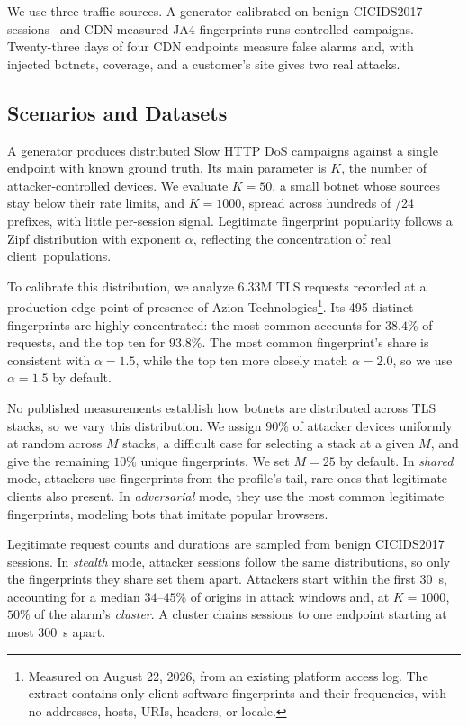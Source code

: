 \documentclass[conference,letterpaper,10pt]{IEEEtran}
\newcommand\1{\textit{(i)}}
\newcommand\2{\textit{(ii)}}
\newcommand\3{\textit{(iii)}}
\newcommand\4{\textit{(iv)}}
\newcommand\5{\textit{(v)}}
\newcommand\6{\textit{(vi)}}
\newcommand\7{\textit{(vii)}}
\newcommand\8{\textit{(viii)}}
\newcommand\9{\textit{(ix)}}
\begin{document}
We use three traffic sources. A generator calibrated on benign CICIDS2017 sessions~\cite{sharafaldin2018cicids} and CDN-measured JA4 fingerprints runs controlled campaigns. Twenty-three days of four CDN endpoints measure false alarms and, with injected botnets, coverage, and a customer's site gives two real attacks.

\subsection{Scenarios and Datasets}

A generator produces distributed Slow HTTP DoS campaigns against a single endpoint with known ground truth. Its main parameter is $K$, the number of attacker-controlled devices. We evaluate $K=50$, a small botnet whose sources stay below their rate limits, and $K=1000$, spread across hundreds of /24 prefixes, with little per-session signal. Legitimate fingerprint popularity follows a Zipf distribution with exponent $\alpha$, reflecting the concentration of real client~populations.

To calibrate this distribution, we analyze $6.33$M TLS requests recorded at a production edge point of presence of Azion Technologies\footnote{Measured on August 22, 2026, from an existing platform access log. The extract contains only client-software fingerprints and their frequencies, with no addresses, hosts, URIs, headers, or locale.}. Its 495 distinct fingerprints are highly concentrated: the most common accounts for $38.4\%$ of requests, and the top ten for $93.8\%$. The most common fingerprint's share is consistent with $\alpha=1.5$, while the top ten more closely match $\alpha=2.0$, so we use $\alpha=1.5$ by default.

No published measurements establish how botnets are distributed across TLS stacks, so we vary this distribution. We assign $90\%$ of attacker devices uniformly at random across $M$ stacks, a difficult case for selecting a stack at a given $M$, and give the remaining $10\%$ unique fingerprints. We set $M=25$ by default. In \textit{shared} mode, attackers use fingerprints from the profile's tail, rare ones that legitimate clients also present. In \textit{adversarial} mode, they use the most common legitimate fingerprints, modeling bots that imitate popular browsers.

Legitimate request counts and durations are sampled from benign CICIDS2017 sessions.  In \textit{stealth} mode, attacker sessions follow the same distributions, so only the fingerprints they share set them apart. Attackers start within the first 30~s, accounting for a median $34$--$45\%$ of origins in attack windows and, at $K=1000$, $50\%$ of the alarm's \textit{cluster}. A cluster chains sessions to one endpoint starting at most 300~s apart.
\end{document}
